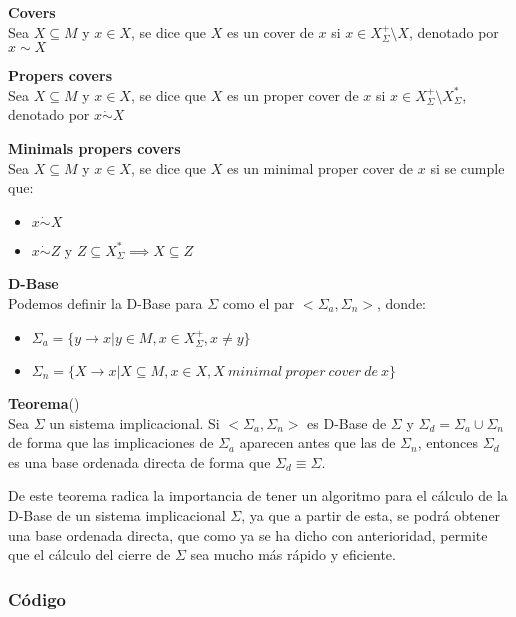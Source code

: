 \textbf{Covers}\\
Sea \(X \subseteq M\) y \(x \in X\), se dice que \(X\) es un cover de \(x\) si \(x \in X^+_{\Sigma} \setminus X\), denotado por \(x \sim X\)

\textbf{Propers covers} \\
Sea \(X \subseteq M\) y \(x \in X\), se dice que \(X\) es un proper cover de \(x\) si \(x \in X^+_{\Sigma} \setminus X^*_{\Sigma}\), denotado por \(x \dot\sim X\)

\textbf{Minimals propers covers}\\
Sea \(X \subseteq M\) y \(x \in X\), se dice que \(X\) es un minimal proper cover de \(x\) si se cumple que:
\begin{itemize}
    \item \(x \dot\sim X\)
    \item \(x \dot\sim Z\) y \(Z \subseteq X^*_{\Sigma} \implies X \subseteq Z\)
\end{itemize}

\textbf{D-Base}\\
Podemos definir la D-Base para \(\Sigma\) como el par \(<\Sigma_a, \Sigma_n>\), donde:

\begin{itemize}
    \item \(\Sigma_a = \{y \to x | y \in M, x \in X^+_{\Sigma}, x \neq y \} \)
    \item \(\Sigma_n = \{X \to x | X \subseteq M, x \in X, X \ minimal \ proper \ cover \ de \ x\} \)

\end{itemize}

\textbf{Teorema}(\cite{Adaricheva})\\
Sea \(\Sigma\) un sistema implicacional. Si \(<\Sigma_a, \Sigma_n>\) es D-Base de \(\Sigma\) y \(\Sigma_d = \Sigma_a\cup \Sigma_n\) de forma que las implicaciones de \(\Sigma_a\) aparecen antes que las de \(\Sigma_n\), entonces \(\Sigma_d\) es una base ordenada directa de forma que \(\Sigma_d \equiv \Sigma\).

De este teorema radica la importancia de tener un algoritmo para el c\'alculo de la D-Base de un sistema implicacional \(\Sigma\), ya que a partir de esta, se podr\'a obtener una base ordenada directa, que como ya se ha dicho con anterioridad, permite que el c\'alculo del cierre de \(\Sigma\) sea mucho m\'as r\'apido y eficiente.\\


\newpage 
\subsubsection{C\'odigo} 

\newpage
